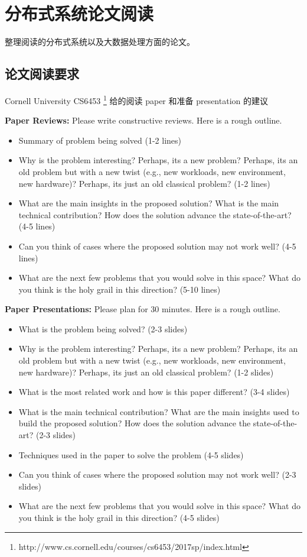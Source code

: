 \chapter{分布式系统论文阅读}\label{chap:papers}

\begin{intro}
整理阅读的分布式系统以及大数据处理方面的论文。
\end{intro}


\section{论文阅读要求}\label{sec:suggestions}

Cornell University CS6453%
\footnote{http://www.cs.cornell.edu/courses/cs6453/2017sp/index.html}%
给的阅读 paper 和准备 presentation 的建议

\textbf{Paper Reviews:} Please write constructive reviews. Here is a rough outline.
\begin{itemize}
	\item Summary of problem being solved (1-2 lines)
	\item Why is the problem interesting? Perhaps, its a new problem? Perhaps, its an old problem but with a new twist (e.g., new workloads, new environment, new hardware)? Perhaps, its just an old classical problem? (1-2 lines)
	\item What are the main insights in the proposed solution? What is the main technical contribution? How does the solution advance the state-of-the-art? (4-5 lines)
	\item Can you think of cases where the proposed solution may not work well? (4-5 lines)
	\item What are the next few problems that you would solve in this space? What do you think is the holy grail in this direction? (5-10 lines)
\end{itemize}

\textbf{Paper Presentations:} Please plan for 30 minutes. Here is a rough outline.
\begin{itemize}
	\item What is the problem being solved? (2-3 slides)
	\item Why is the problem interesting? Perhaps, its a new problem? Perhaps, its an old problem but with a new twist (e.g., new workloads, new environment, new hardware)? Perhaps, its just an old classical problem? (1-2 slides)
	\item What is the most related work and how is this paper different? (3-4 slides)
	\item What is the main technical contribution? What are the main insights used to build the proposed solution? How does the solution advance the state-of-the-art? (2-3 slides)
	\item Techniques used in the paper to solve the problem (4-5 slides)
	\item Can you think of cases where the proposed solution may not work well? (2-3 slides)
	\item What are the next few problems that you would solve in this space? What do you think is the holy grail in this direction? (4-5 slides)
\end{itemize}

